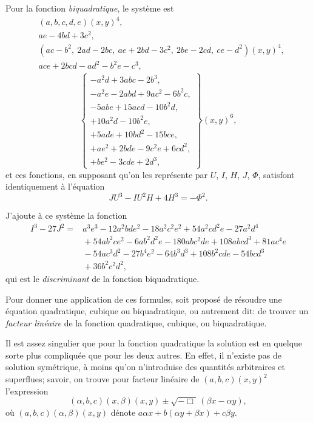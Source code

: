 \documentclass[11pt,a4paper]{article}
\begin{document}
\medskip

Pour la fonction \textit{biquadratique}, le syst\`eme est
\begin{align*}
& (a,b,c,d,e)(x,y)^4,\\
& ae - 4bd + 3c^2,\\
& (ac - b^2,\ 2ad - 2bc,\ ae + 2bd - 3c^2,\ 2be - 2cd,\ ce - d^2)(x,y)^4,\\
& ace + 2bcd - ad^2 - b^2 e - c^3,
\end{align*}
\[
\left\{\begin{array}{l}
-a^2 d + 3abc - 2b^3,\\
-a^2 e - 2abd + 9ac^2 - 6b^2 c,\\
-5abe + 15acd - 10 b^2 d,\\
+10 a^2 d - 10 b^2 e,\\
+5ade + 10bd^2 - 15bce,\\
+ae^2 + 2bde - 9c^2 e + 6cd^2,\\
+be^2 - 3cde + 2d^3,
\end{array}\right\}(x,y)^6,
\]
et ces fonctions, en supposant qu'on les repr\'esente par $U$, $I$, $H$, $J$, $\Phi$, satisfont identiquement \`a l'\'equation
\[
JU^3 - I U^2 H + 4 H^3 = -\Phi^2.
\]

\medskip

J'ajoute \`a ce syst\`eme la fonction
\begin{align*}
I^3 - 27 J^2 ={}& a^3 e^3 - 12 a^2 b d e^2 - 18 a^2 c^2 e^2 + 54 a^2 c d^2 e - 27 a^2 d^4\\
&{}+ 54 a b^2 c e^2 - 6 a b^2 d^2 e - 180 a b c^2 d e + 108 a b c d^3 + 81 a c^4 e\\
&{}- 54 a c^3 d^2 - 27 b^4 e^2 - 6 4 b^3 d^3 + 108 b^2 c d e - 54 b c d^3\\
&{}+ 36 b^2 c^2 d^2,
\end{align*}
qui est le \textit{discriminant} de la fonction biquadratique.

\medskip

Pour donner une application de ces formules, soit propos\'e de r\'esoudre une \'equation quadratique, cubique ou biquadratique, ou autrement dit: de trouver un \textit{facteur lin\'eaire} de la fonction quadratique, cubique, ou biquadratique.

\medskip

Il est assez singulier que pour la fonction quadratique la solution est en quelque sorte plus compliqu\'ee que pour les deux autres. En effet, il n'existe pas de solution sym\'etrique, \`a moins qu'on n'introduise des quantit\'es arbitraires et superflues; savoir, on trouve pour facteur lin\'eaire de $(a,b,c)(x,y)^2$ l'expression
\[
(\alpha,b,c)(x,\beta)(x,y) \pm \sqrt{-\Box}\,(\beta x - \alpha y),
\]
o\`u $(a,b,c)(\alpha,\beta)(x,y)$ d\'enote $a\alpha x + b(\alpha y + \beta x) + c\beta y$.
\end{document}

